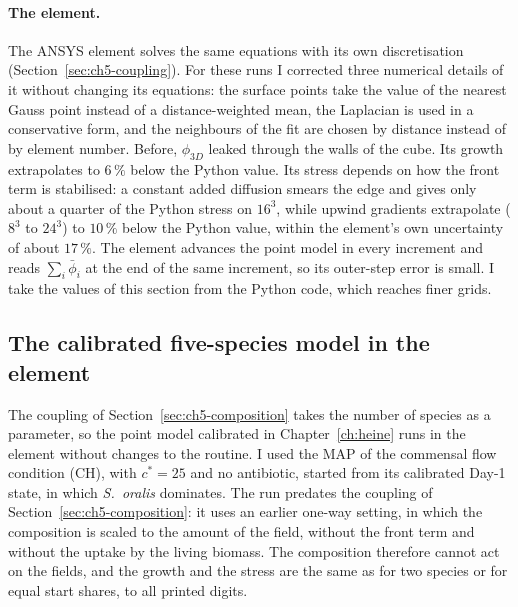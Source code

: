 \paragraph{The element.} The ANSYS element solves the same equations with its own discretisation
(Section~\ref{sec:ch5-coupling}). For these runs I corrected three numerical details of it without changing its
equations: the surface points take the value of the nearest Gauss point instead of a distance-weighted mean, the
Laplacian is used in a conservative form, and the neighbours of the fit are chosen by distance instead of by element
number. Before, $\phi_{3D}$ leaked through the walls of the cube. Its growth extrapolates to $6\,\%$ below the Python value.
Its stress depends on how the front term \fterm{} is stabilised: a constant added diffusion smears the edge and gives only
about a quarter of the Python stress on $16^3$, while upwind gradients extrapolate ($8^3$ to $24^3$) to $10\,\%$ below the
Python value, within the element's own uncertainty of about $17\,\%$. The element advances the point model in every
increment and reads $\sum_i\bar\phi_i$ at the end of the same increment, so its outer-step error is small. I take the
values of this section from the Python code, which reaches finer grids.



\subsection{The calibrated five-species model in the element}
\label{sec:ch5-five}

The coupling of Section~\ref{sec:ch5-composition} takes the number of species
as a parameter, so the point model calibrated in Chapter~\ref{ch:heine} runs in the element without changes to the
routine. I used the MAP of the commensal flow condition (CH), with $c^*=25$ and no antibiotic, started from its calibrated
Day-1 state, in which \textit{S.~oralis} dominates. The run predates the coupling of Section~\ref{sec:ch5-composition}:
it uses an earlier one-way setting, in which the composition is scaled to the amount of the field, without the front term
\fterm{} and without the uptake by the living biomass. The composition therefore cannot act on the fields, and the growth
and the stress are the same as for two species or for equal start shares, to all printed digits.

